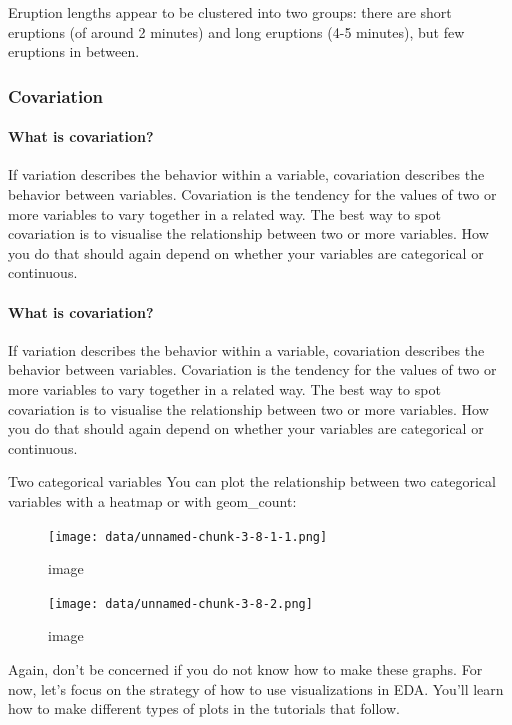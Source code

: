 \documentclass[
]{article}
\begin{document}
Eruption lengths appear to be clustered into two groups: there are short
eruptions (of around 2 minutes) and long eruptions (4-5 minutes), but
few eruptions in between.

\hypertarget{covariation}{%
\subsubsection{Covariation}\label{covariation}}

\hypertarget{what-is-covariation}{%
\paragraph{What is covariation?}\label{what-is-covariation}}

If variation describes the behavior within a variable, covariation
describes the behavior between variables. Covariation is the tendency
for the values of two or more variables to vary together in a related
way. The best way to spot covariation is to visualise the relationship
between two or more variables. How you do that should again depend on
whether your variables are categorical or continuous.

\hypertarget{what-is-covariation-1}{%
\paragraph{What is covariation?}\label{what-is-covariation-1}}

If variation describes the behavior within a variable, covariation
describes the behavior between variables. Covariation is the tendency
for the values of two or more variables to vary together in a related
way. The best way to spot covariation is to visualise the relationship
between two or more variables. How you do that should again depend on
whether your variables are categorical or continuous.

Two categorical variables You can plot the relationship between two
categorical variables with a heatmap or with geom\_count:

\begin{figure}
\centering
\texttt{[image: data/unnamed-chunk-3-8-1-1.png]}
\caption{image}
\end{figure}

\begin{figure}
\centering
\texttt{[image: data/unnamed-chunk-3-8-2.png]}
\caption{image}
\end{figure}

Again, don't be concerned if you do not know how to make these graphs.
For now, let's focus on the strategy of how to use visualizations in
EDA. You'll learn how to make different types of plots in the tutorials
that follow.
\end{document}
